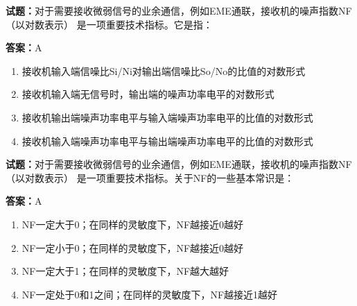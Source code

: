 \documentclass{ctexbook}
\begin{document}





\vspace{1em}

\textbf{试题：}对于需要接收微弱信号的业余通信，例如EME通联，接收机的噪声指数NF（以对数表示）
是一项重要技术指标。它是指： 

\textbf{答案：}A 

\begin{enumerate}[leftmargin=3em]
  \item 接收机输入端信噪比Si/Ni对输出端信噪比So/No的比值的对数形式 

  \item 接收机输入端无信号时，输出端的噪声功率电平的对数形式 

  \item 接收机输出端噪声功率电平与输入端噪声功率电平的比值的对数形式 

  \item 接收机输入端噪声功率电平与输出端噪声功率电平的比值的对数形式 

\end{enumerate}





\vspace{1em}

\textbf{试题：}对于需要接收微弱信号的业余通信，例如EME通联，接收机的噪声指数NF（以对数表示）
是一项重要技术指标。关于NF的一些基本常识是： 

\textbf{答案：}A 

\begin{enumerate}[leftmargin=3em]
  \item NF一定大于0；在同样的灵敏度下，NF越接近0越好 

  \item NF一定小于0；在同样的灵敏度下，NF越接近0越好 

  \item NF一定大于1；在同样的灵敏度下，NF越大越好 

  \item NF一定处于0和1之间；在同样的灵敏度下，NF越接近1越好 

\end{enumerate}



\end{document}

